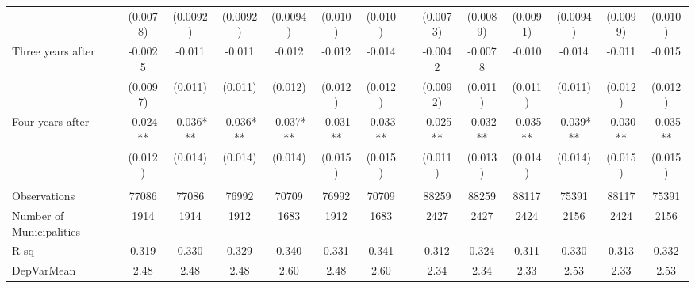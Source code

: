 \begin{tabular}{lccccccccccccc}
      & (0.0078) & (0.0092) & (0.0092) & (0.0094) & (0.010) & (0.010) &       & (0.0073) & (0.0089) & (0.0091) & (0.0094) & (0.0099) & (0.010) \\
Three years after & -0.0025 & -0.011 & -0.011 & -0.012 & -0.012 & -0.014 &       & -0.0042 & -0.0078 & -0.010 & -0.014 & -0.011 & -0.015 \\
      & (0.0097) & (0.011) & (0.011) & (0.012) & (0.012) & (0.012) &       & (0.0092) & (0.011) & (0.011) & (0.011) & (0.012) & (0.012) \\
Four years after & -0.024** & -0.036*** & -0.036*** & -0.037*** & -0.031** & -0.033** &       & -0.025** & -0.032** & -0.035** & -0.039*** & -0.030** & -0.035** \\
      & (0.012) & (0.014) & (0.014) & (0.014) & (0.015) & (0.015) &       & (0.011) & (0.013) & (0.014) & (0.014) & (0.015) & (0.015) \\
      &       &       &       &       &       &       &       &       &       &       &       &       &  \\
\midrule
Observations & 77086 & 77086 & 76992 & 70709 & 76992 & 70709 &       & 88259 & 88259 & 88117 & 75391 & 88117 & 75391 \\
Number of Municipalities & 1914  & 1914  & 1912  & 1683  & 1912  & 1683  &       & 2427  & 2427  & 2424  & 2156  & 2424  & 2156 \\
R-sq  & 0.319 & 0.330 & 0.329 & 0.340 & 0.331 & 0.341 &       & 0.312 & 0.324 & 0.311 & 0.330 & 0.313 & 0.332 \\
DepVarMean & 2.48  & 2.48  & 2.48  & 2.60  & 2.48  & 2.60  &       & 2.34  & 2.34  & 2.33  & 2.53  & 2.33  & 2.53 \\
\bottomrule
\bottomrule
\end{tabular}%
